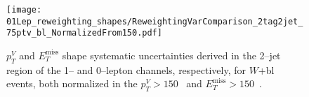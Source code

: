 \begin{figure}[ht!]
  \centering
  \texttt{[image: 01Lep\_reweighting\_shapes/ReweightingVarComparison\_2tag2jet\_75ptv\_bl\_NormalizedFrom150.pdf]}
  \caption[A normalised comparison of 0-- and 1--lepton channel derived $p_T^V$ and
  $E_T^{\text{miss}}$ shape systematic uncertainties on W + jets
  events.]{$p_T^V$ and $E_T^{\text{miss}}$ shape systematic uncertainties
    derived in the 2--jet region of the 1-- and 0--lepton channels,
    respectively, for $W$+bl events, both normalized in the $p_T^V > 150$~\GeV
    and $E_T^{\text{miss}} > 150$~\GeV.}
  \label{fig:wjets_01lep_2jet_bl_SysWPtVBDTr_From150}
\end{figure}